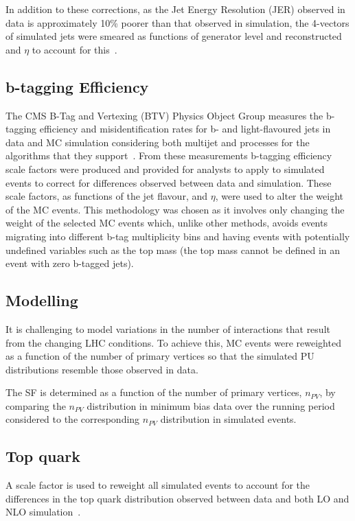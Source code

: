 In addition to these corrections, as the Jet Energy Resolution (JER) observed in data is approximately 10\% poorer than that observed in simulation, the 4-vectors of simulated jets were smeared as functions of generator level and reconstructed \pt and $\eta$ to account for this~\cite{Khachatryan:2016kdb}.

\subsection{b-tagging Efficiency}\label{subsec:btagEff}
The CMS B-Tag and Vertexing (BTV) Physics Object Group measures the b-tagging efficiency and misidentification rates for b- and light-flavoured jets in data and MC simulation considering both multijet and \ttbar processes for the algorithms that they support~\cite{Sirunyan:2017ezt}.
From these measurements b-tagging efficiency scale factors were produced and provided for analysts to apply to simulated events to correct for differences observed between data and simulation.
These scale factors, as functions of the jet flavour, \pT and $\eta$, were used to alter the weight of the MC events.
This methodology was chosen as it involves only changing the weight of the selected MC events which, unlike other methods, avoids events migrating into different b-tag multiplicity bins and having events with potentially undefined variables such as the top mass (\ie the top mass cannot be defined in an event with zero b-tagged jets).

\subsection{\PU Modelling}\label{subsec:puSF}
It is challenging to model variations in the number of \PU interactions that result from the changing LHC conditions.
To achieve this, MC events were reweighted as a function of the number of primary vertices so that the simulated PU distributions resemble those observed in data.

The \PU SF is determined as a function of the number of primary vertices, $n_{PV}$, by comparing the $n_{PV}$ distribution in minimum bias data over the running period considered to the corresponding $n_{PV}$ distribution in simulated events.

\subsection{Top quark \pt}
A scale factor is used to reweight all simulated \ttbar events to account for the differences in the top quark \pt distribution observed between data and both LO and NLO simulation~\cite{Khachatryan:2015oqa}.

